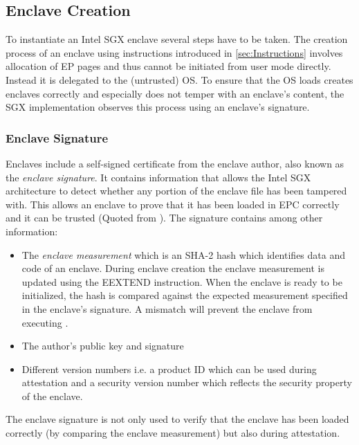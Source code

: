 \subsection{Enclave Creation}
To instantiate an Intel SGX enclave several steps have to be taken. The creation process of an enclave using instructions introduced in \cref{sec:Instructions} involves allocation
of EP pages and thus cannot be initiated from user mode directly. Instead it is delegated to the (untrusted) OS. To ensure that the OS loads creates enclaves correctly and
especially does not temper with an enclave's content, the SGX implementation observes this process using an enclave's signature.

\subsubsection{Enclave Signature}
\label{sec:EnclaveSignature}
Enclaves include a self-signed certificate from the enclave author, also known as the \textit{enclave signature}. It contains information that allows the Intel SGX architecture 
to detect whether any portion of the enclave file has been tampered with. This allows an enclave to prove that it has been loaded in EPC correctly and it can be trusted (Quoted
from \cite{IntelEnclaveSignature}). The signature contains among other information:
\begin{itemize}
    \item The \textit{enclave measurement} which is an SHA-2 hash \cite{Costan2016IntelSE} which identifies data and code of an enclave. During enclave creation the enclave
          measurement is updated using the EEXTEND instruction. When the enclave is ready to be initialized, the hash is compared against the expected measurement specified
          in the enclave's signature. A mismatch will prevent the enclave from executing \cite{IntelEnclaveSignature}.
    \item The author's public key and signature
    \item Different version numbers i.e. a product ID which can be used during attestation and a security version number which reflects the security property of the enclave.
\end{itemize}
The enclave signature is not only used to verify that the enclave has been loaded correctly (by comparing the enclave measurement) but also during attestation.